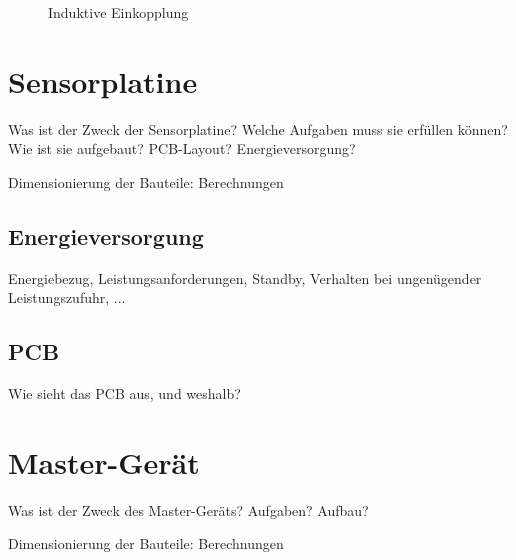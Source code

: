 \begin{figure}[h!tb]
    \centering
    
    \caption{Induktive Einkopplung}
    \label{fig:circ:coupling:inductive}
\end{figure}


\clearpage
\section{Sensorplatine}
\label{sec:hw:sensorplatine}

Was  ist der  Zweck  der Sensorplatine? Welche  Aufgaben  muss sie  erf\"ullen
k\"onnen? Wie ist sie aufgebaut? PCB-Layout? Energieversorgung?

\anweisung Dimensionierung der Bauteile: Berechnungen

\subsection{Energieversorgung}
\label{subsec:sensor:pcb}

Energiebezug,  Leistungsanforderungen, Standby,  Verhalten bei  ungen\"ugender
Leistungszufuhr, ...


\subsection{PCB}
\label{subsec:sensor:pcb}

Wie sieht das PCB aus, und weshalb?

\section{Master-Ger\"at}
\label{sec:hw:mastergerat}

Was ist der Zweck des Master-Ger\"ats? Aufgaben? Aufbau?

\anweisung Dimensionierung der Bauteile: Berechnungen


